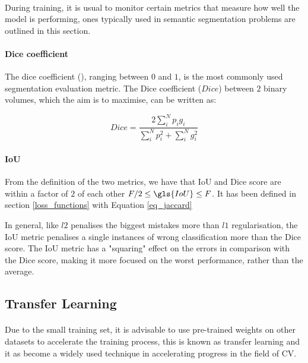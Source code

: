 \paragraph{}
During training, it is usual to monitor certain metrics that measure how well the model is performing, ones typically used in semantic segmentation problems are outlined in this section.
\paragraph{Dice coefficient}
The dice coefficient (\cite{7785132}), ranging between $0$ and $1$, is the most commonly used segmentation evaluation metric. The Dice coefficient ($Dice$) between $2$ binary volumes, which the aim is to maximise, can be written as:

\begin{equation}
    \label{eq_dice_coef}
    Dice=\frac{2\sum_{{i}}^{N}p_{i}g_{i}}{\sum_{i}^{N}p_{i}^{2}+\sum_{i}^{N}g_{{i}}^{2}}
\end{equation}

\paragraph{\gls{IoU}}
From the definition of the two metrics, we have that \gls{IoU} and Dice score are within a factor of $2$ of each other $F/2 \leq \gls{IoU} \leq F$. It has been defined in section \ref{loss_functions} with Equation \ref{eq_jaccard}

In general, like $l2$ penalises the biggest mistakes more than $l1$ regularisation, the \gls{IoU} metric penalises a single instances of wrong classification more than the Dice score. The \gls{IoU} metric has a "squaring" effect on the errors in comparison with the Dice score, making it more focused on the worst performance, rather than the average.

\subsection{Transfer Learning} \label{transfer_learning}
\paragraph{}
Due to the small training set, it is advisable to use pre-trained weights on other datasets to accelerate the training process, this is known as transfer learning and it as become a widely used technique in accelerating progress in the field of \gls{CV}.

